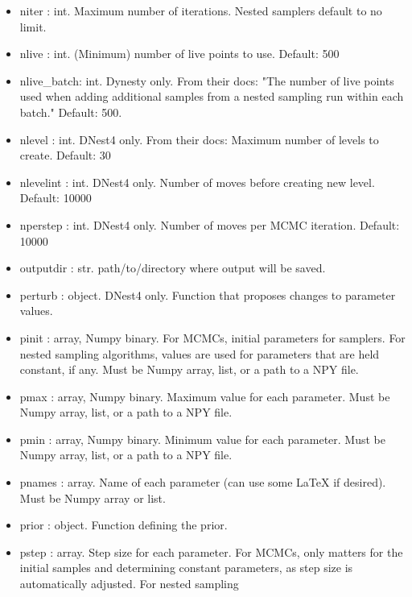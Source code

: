 \documentclass[letterpaper, 12pt]{article}
\begin{document}
\begin{itemize}
\item niter : int. Maximum number of iterations.  Nested samplers  
                       default to no limit.
\item nlive : int. (Minimum) number of live points to use. Default: 500
\item nlive\_batch: int. Dynesty only. From their docs: "The number of  
                         live points used when adding additional  
                         samples from a nested sampling run within  
                         each batch."  Default: 500.
\item nlevel : int. DNest4 only. From their docs: Maximum number of levels to 
                    create.  Default: 30
\item nlevelint : int. DNest4 only. Number of moves before creating new level. 
                       Default: 10000
\item nperstep : int. DNest4 only. Number of moves per MCMC iteration.  
                      Default: 10000
\item outputdir : str. path/to/directory where output will be saved.
\item perturb : object. DNest4 only. Function that proposes changes to 
                        parameter values.
\item pinit : array, Numpy binary. For MCMCs, initial parameters for  
                            samplers.  For nested sampling algorithms,  
                            values are used for parameters that are held  
                            constant, if any. 
                        Must be Numpy array, list, or a path to a NPY file.
\item pmax : array, Numpy binary. Maximum value for each parameter. 
                        Must be Numpy array, list, or a path to a NPY file.
\item pmin : array, Numpy binary. Minimum value for each parameter. 
                        Must be Numpy array, list, or a path to a NPY file.
\item pnames : array. Name of each parameter (can use some LaTeX if  
                          desired). 
                          Must be Numpy array or list.
\item prior : object. Function defining the prior.
\item pstep : array. Step size for each parameter.  For MCMCs, only  
                         matters for the initial samples and determining  
                         constant parameters, as step size is  
                         automatically adjusted.  For nested sampling  

\end{itemize}
\end{document}
